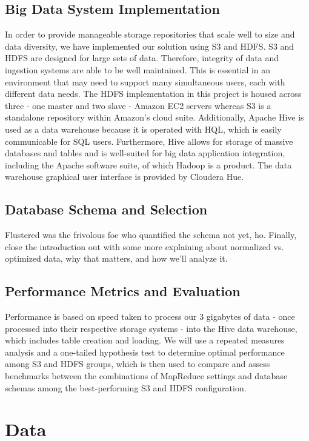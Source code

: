 \documentclass[journal]{IEEEtran}
\begin{document}
\subsection{Big Data System Implementation}
In order to provide manageable storage repositories that scale well to size and data diversity, we have implemented our solution using S3 and HDFS. S3 and HDFS are designed for large sets of data. Therefore, integrity of data and ingestion systems are able to be well maintained. This is essential in an environment that may need to support many simultaneous users, each with different data needs. The HDFS implementation in this project is housed across three - one master and two slave - Amazon EC2 servers whereas S3 is a standalone repository within Amazon's cloud suite.
Additionally, Apache Hive is used as a data warehouse because it is operated with HQL, which is easily communicable for SQL users. Furthermore, Hive allows for storage of massive databases and tables and is well-suited for big data application integration, including the Apache software suite, of which Hadoop is a product. The data warehouse graphical user interface is provided by Cloudera Hue.
\subsection{Database Schema and Selection}
Flustered was the frivolous foe who quantified the schema not yet, ho. Finally, close the introduction out with some more explaining about normalized vs. optimized data, why that matters, and how we'll analyze it.
\subsection{Performance Metrics and Evaluation}
Performance is based on speed taken to process our 3 gigabytes of data - once processed into their respective storage systems - into the Hive data warehouse, which includes table creation and loading. We will use a repeated measures analysis and a one-tailed hypothesis test to determine optimal performance among S3 and HDFS groups, which is then used to compare and assess benchmarks between the combinations of MapReduce settings and database schemas among the best-performing S3 and HDFS configuration.




\section{Data}
\end{document}
